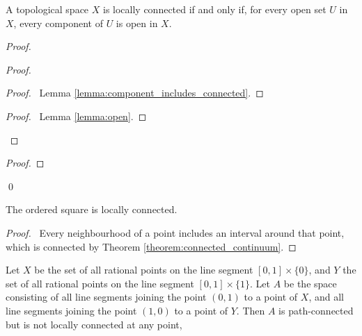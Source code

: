 \begin{theorem}
    \label{theorem:open_component_locally_connected}
    A topological space $X$ is locally connected if and only if, for every
    open set $U$ in $X$, every component of $U$ is open in $X$.
\end{theorem}

\begin{proof}
    \pf
    \begin{proof}
        \begin{proof}
            \pf\ Lemma \ref{lemma:component_includes_connected}.
        \end{proof}
        \qedstep
        \begin{proof}
            \pf\ Lemma \ref{lemma:open}.
        \end{proof}
    \end{proof}
    \begin{proof}
    \end{proof}
    \qed
\end{proof}

\begin{example}
    The ordered square is locally connected.
\end{example}

\begin{proof}
    \pf\ Every neighbourhood of a point includes an interval around that point, which is connected 
    by Theorem \ref{theorem:connected_continuum}.
\end{proof}

\begin{example}
    Let $X$ be the set of all rational points on the line segment $[0,1] \times \{0\}$,
    and $Y$ the set of all rational points on the line segment $[0,1] \times \{1\}$.
    Let $A$ be the space consisting of all line segments joining the point $(0,1)$ to a point
    of $X$, and all line segments joining the point $(1,0)$ to a point of $Y$. Then $A$ is
    path-connected but is not locally connected at any point,
\end{example}

